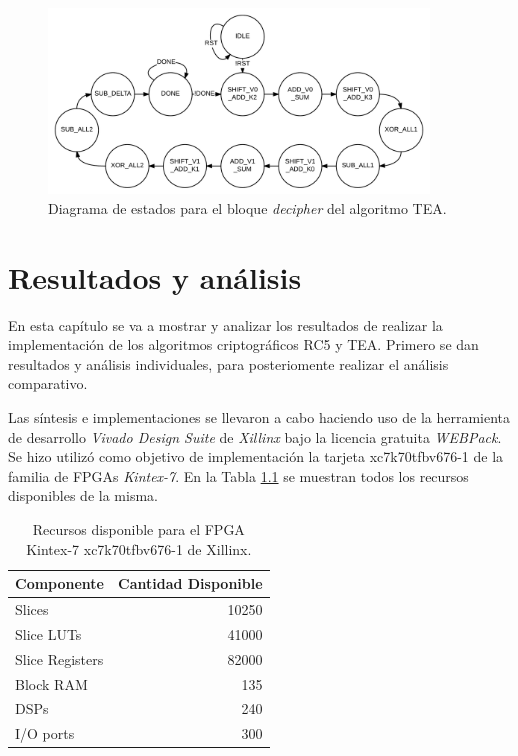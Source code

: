 \begin{figure}
	\centering
	\includegraphics[width=0.9\textwidth]{./images/figDecipherTeaFSM}
	\caption{Diagrama de estados para el bloque \textit{decipher} del algoritmo TEA.}
	\label{figDecipherTeaFSM}
\end{figure}





\chapter{Resultados y análisis}
En esta capítulo se va a mostrar y analizar los resultados de realizar la implementación de los algoritmos criptográficos RC5 y TEA.
Primero se dan resultados y análisis individuales, para posteriomente realizar el análisis comparativo.

Las síntesis e implementaciones se llevaron a cabo haciendo uso de la herramienta de desarrollo \textit{Vivado Design Suite} de \textit{Xillinx} bajo la licencia gratuita \textit{WEBPack}. Se hizo utilizó como objetivo de implementación la tarjeta xc7k70tfbv676-1 de la familia de FPGAs \textit{Kintex-7}. En la Tabla \ref{tabRecursosFPGA} se muestran todos los recursos disponibles de la misma. 

\begin{table}[htbp]
  \centering
  \caption{Recursos disponible para el FPGA Kintex-7 xc7k70tfbv676-1 de Xillinx.}
    \begin{tabular}{lr}
    \toprule
    Componente & Cantidad Disponible\\
    \midrule
	Slices & 10250\\
	Slice LUTs & 41000\\
	Slice Registers & 82000\\
	Block RAM & 135\\
	DSPs & 240\\
	I/O ports & 300\\
    \bottomrule
    \end{tabular}%
  \label{tabRecursosFPGA}%
\end{table}%

